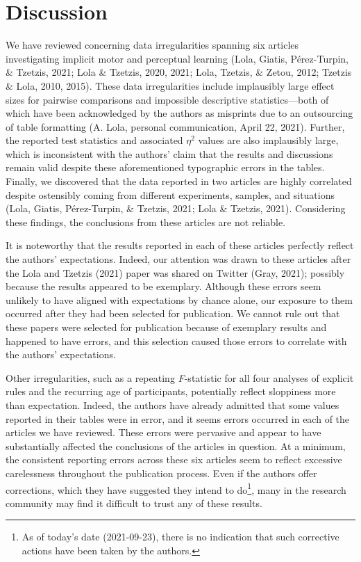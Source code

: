 \documentclass[
  english,
  man, donotrepeattitle,floatsintext]{apa7}
\begin{document}
\hypertarget{discussion}{%
\section{Discussion}\label{discussion}}

We have reviewed concerning data irregularities spanning six articles investigating implicit motor and perceptual learning (Lola, Giatis, Pérez-Turpin, \& Tzetzis, 2021; Lola \& Tzetzis, 2020, 2021; Lola, Tzetzis, \& Zetou, 2012; Tzetzis \& Lola, 2010, 2015). These data irregularities include implausibly large effect sizes for pairwise comparisons and impossible descriptive statistics---both of which have been acknowledged by the authors as misprints due to an outsourcing of table formatting (A. Lola, personal communication, April 22, 2021). Further, the reported test statistics and associated \(\eta^{2}\) values are also implausibly large, which is inconsistent with the authors' claim that the results and discussions remain valid despite these aforementioned typographic errors in the tables. Finally, we discovered that the data reported in two articles are highly correlated despite ostensibly coming from different experiments, samples, and situations (Lola, Giatis, Pérez-Turpin, \& Tzetzis, 2021; Lola \& Tzetzis, 2021). Considering these findings, the conclusions from these articles are not reliable.

It is noteworthy that the results reported in each of these articles perfectly reflect the authors' expectations. Indeed, our attention was drawn to these articles after the Lola and Tzetzis (2021) paper was shared on Twitter (Gray, 2021); possibly because the results appeared to be exemplary. Although these errors seem unlikely to have aligned with expectations by chance alone, our exposure to them occurred after they had been selected for publication. We cannot rule out that these papers were selected for publication because of exemplary results and happened to have errors, and this selection caused those errors to correlate with the authors' expectations.

Other irregularities, such as a repeating \emph{F}-statistic for all four analyses of explicit rules and the recurring age of participants, potentially reflect sloppiness more than expectation. Indeed, the authors have already admitted that some values reported in their tables were in error, and it seems errors occurred in each of the articles we have reviewed. These errors were pervasive and appear to have substantially affected the conclusions of the articles in question. At a minimum, the consistent reporting errors across these six articles seem to reflect excessive carelessness throughout the publication process. Even if the authors offer corrections, which they have suggested they intend to do\footnote{As of today's date (2021-09-23), there is no indication that such corrective actions have been taken by the authors.}, many in the research community may find it difficult to trust any of these results.
\end{document}
